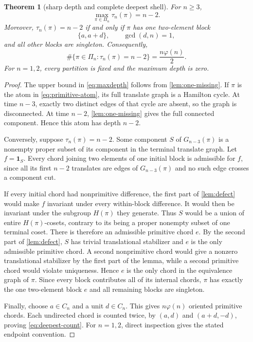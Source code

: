 \documentclass[11pt,a4paper]{amsart}
\newtheorem{theorem}{Theorem}[section]
\theoremstyle{definition}
\theoremstyle{remark}
\newcommand{\Cn}{C_n}
\newcommand{\Pin}{\Pi_n}
\begin{document}
\begin{theorem}[sharp depth and complete deepest shell]\label{thm:depth}
For $n\geq3$,
\begin{equation}\label{eq:maxdepth}
        \max_{\pi\in\Pin}\tau_n(\pi)=n-2.
\end{equation}
Moreover, $\tau_n(\pi)=n-2$ if and only if $\pi$ has one two-element block
\begin{equation}\label{eq:primitive-atom}
        \{a,a+d\},\qquad \gcd(d,n)=1,
\end{equation}
and all other blocks are singleton.  Consequently,
\begin{equation}\label{eq:deepest-count}
 \boxed{\displaystyle
 \#\{\pi\in\Pin:\tau_n(\pi)=n-2\}
 =\frac{n\varphi(n)}2.}
\end{equation}
For $n=1,2$, every partition is fixed and the maximum depth is zero.
\end{theorem}

\begin{proof}
The upper bound in \eqref{eq:maxdepth} follows from
\cref{lem:one-missing}.  If $\pi$ is the atom in
\eqref{eq:primitive-atom}, its full translate graph is a Hamilton cycle.
At time $n-3$, exactly two distinct edges of that cycle are absent, so the
graph is disconnected.  At time $n-2$, \cref{lem:one-missing} gives the
full connected component.  Hence this atom has depth $n-2$.

Conversely, suppose $\tau_n(\pi)=n-2$.  Some component $S$ of
$G_{n-3}(\pi)$ is a nonempty proper subset of its component in the terminal
translate graph.  Let $f=\mathbf1_S$.  Every chord joining two elements of
one initial block is admissible for $f$, since all its first $n-2$
translates are edges of $G_{n-3}(\pi)$ and no such edge crosses a component
cut.

If every initial chord had nonprimitive difference, the first part of
\cref{lem:defect} would make $f$ invariant under every within-block
difference.  It would then be invariant under the subgroup $H(\pi)$ they
generate.  Thus $S$ would be a union of entire $H(\pi)$-cosets, contrary to
its being a proper nonempty subset of one terminal coset.  There is
therefore an admissible primitive chord $e$.  By the second part of
\cref{lem:defect}, $S$ has trivial translational stabilizer and $e$ is the
only admissible primitive chord.  A second nonprimitive chord would give a
nonzero translational stabilizer by the first part of the lemma, while a
second primitive chord would violate uniqueness.  Hence $e$ is the only
chord in the equivalence graph of $\pi$.  Since every block contributes all
of its internal chords, $\pi$ has exactly the one two-element block $e$ and
all remaining blocks are singleton.

Finally, choose $a\in\Cn$ and a unit $d\in\Cn$.  This gives
$n\varphi(n)$ oriented primitive chords.  Each undirected chord is counted
twice, by $(a,d)$ and $(a+d,-d)$, proving
\eqref{eq:deepest-count}.  For $n=1,2$, direct inspection gives the stated
endpoint convention.
\end{proof}
\end{document}
